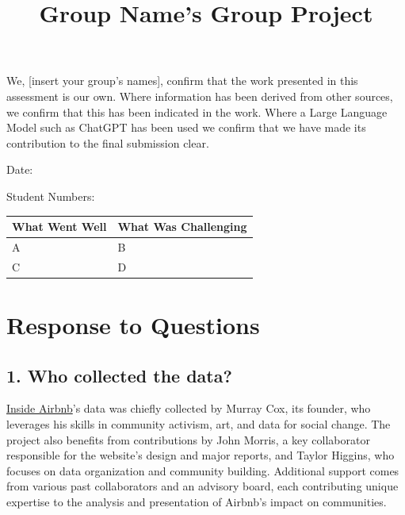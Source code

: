 \documentclass[
  letterpaper,
  DIV=11,
  numbers=noendperiod]{scrartcl}
\title{Group Name's Group Project}
\author{}
\date{}
\begin{document}
\maketitle
\ifdefined\Shaded\renewenvironment{Shaded}{\begin{tcolorbox}[enhanced, breakable, boxrule=0pt, borderline west={3pt}{0pt}{shadecolor}, interior hidden, sharp corners, frame hidden]}{\end{tcolorbox}}\fi

We, {[}insert your group's names{]}, confirm that the work presented in
this assessment is our own. Where information has been derived from
other sources, we confirm that this has been indicated in the work.
Where a Large Language Model such as ChatGPT has been used we confirm
that we have made its contribution to the final submission clear.

Date:

Student Numbers:

\begin{longtable}[]{@{}ll@{}}
\toprule\noalign{}
What Went Well & What Was Challenging \\
\midrule\noalign{}
\endhead
\bottomrule\noalign{}
\endlastfoot
A & B \\
C & D \\
\end{longtable}

\hypertarget{response-to-questions}{%
\section{Response to Questions}\label{response-to-questions}}

\hypertarget{who-collected-the-data}{%
\subsection{1. Who collected the data?}\label{who-collected-the-data}}

\href{http://insideairbnb.com/about/}{Inside Airbnb}'s data was chiefly
collected by Murray Cox, its founder, who leverages his skills in
community activism, art, and data for social change. The project also
benefits from contributions by John Morris, a key collaborator
responsible for the website's design and major reports, and Taylor
Higgins, who focuses on data organization and community building.
Additional support comes from various past collaborators and an advisory
board, each contributing unique expertise to the analysis and
presentation of Airbnb's impact on communities.
\end{document}
